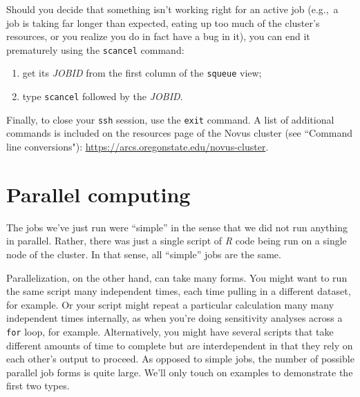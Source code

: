 \documentclass[12pt,letterpaper]{article}
\begin{document}
Should you decide that something isn't working right for an active job
(e.g.,~a job is taking far longer than expected, eating up too much of the cluster's resources, or you realize you do in fact have a bug in it), 
you can end it prematurely using the \texttt{scancel} command:
\begin{enumerate}
	\item get its \emph{JOBID} from the first column of the \texttt{squeue} view;
	\item type \texttt{scancel} followed by the \emph{JOBID}.
\end{enumerate}

Finally, to close your \texttt{ssh} session, use the \texttt{exit} command.
A list of additional commands is included on the resources page of the Novus cluster (see ``Command line conversions"): 
\url{https://arcs.oregonstate.edu/novus-cluster}. 


\section{Parallel computing}

The jobs we've just run were ``simple'' in the sense that we did not run anything in parallel.
Rather, there was just a single script of \emph{R} code being run on a single node of the cluster.
In that sense, all ``simple'' jobs are the same.

Parallelization, on the other hand, can take many forms.
You might want to run the same script many independent times, each time pulling in a different dataset, for example.
Or your script might repeat a particular calculation many many independent times internally, as when you're doing sensitivity analyses across a \texttt{for} loop, for example.
Alternatively, you might have several scripts that take different amounts of time to complete but are interdependent in that they rely on each other's output to proceed.
As opposed to simple jobs, the number of possible parallel job forms is quite large.
We'll only touch on examples to demonstrate the first two types.
\end{document}
